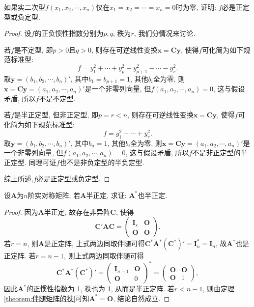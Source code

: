 \documentclass[../../main.tex]{subfiles}
\begin{document}
\begin{proposition}\label{proposition:实二次型只在原点处为零必是正定或负定型}
如果实二次型$f(x_1, x_2, \cdots, x_n)$仅在$x_1 = x_2 = \cdots = x_n = 0$时为零, 证明: $f$必是正定型或负定型.
\end{proposition}
\begin{proof}
设$f$的正负惯性指数分别为$p,q$, 秩为$r$, 我们分情况来讨论.

若$f$是不定型, 即$p > 0$且$q > 0$, 则存在可逆线性变换$\boldsymbol{x}=\boldsymbol{C}\boldsymbol{y}$, 使得$f$可化简为如下规范标准型:
\[
f = y_1^2 + \cdots + y_p^2 - y_{p + 1}^2 - \cdots - y_r^2.
\]
取$\boldsymbol{y}=(b_1, b_2, \cdots, b_n)'$, 其中$b_1 = b_{p + 1} = 1$, 其他$b_i$全为零, 则$\boldsymbol{x}=\boldsymbol{C}\boldsymbol{y}=(a_1, a_2, \cdots, a_n)'$是一个非零列向量, 但$f(a_1, a_2, \cdots, a_n) = 0$, 这与假设矛盾, 所以$f$不是不定型.

若$f$是半正定型, 但非正定型, 即$p = r < n$, 则存在可逆线性变换$\boldsymbol{x}=\boldsymbol{C}\boldsymbol{y}$, 使得$f$可化简为如下规范标准型:
\[
f = y_1^2 + \cdots + y_r^2.
\]
取$\boldsymbol{y}=(b_1, b_2, \cdots, b_n)'$, 其中$b_n = 1$, 其他$b_i$全为零, 则$\boldsymbol{x}=\boldsymbol{C}\boldsymbol{y}=(a_1, a_2, \cdots, a_n)'$是一个非零列向量, 但$f(a_1, a_2, \cdots, a_n) = 0$, 这与假设矛盾, 所以$f$不是非正定型的半正定型. 同理可证$f$也不是非负定型的半负定型.

综上所述,$f$必是正定型或负定型. 

\end{proof}

\begin{proposition}\label{proposition:半正定阵的伴随也半正定}
设$\boldsymbol{A}$为$n$阶实对称矩阵, 若$\boldsymbol{A}$半正定, 求证: $\boldsymbol{A}^*$也半正定.
\end{proposition}
\begin{proof}
因为$\boldsymbol{A}$半正定, 故存在非异阵$\boldsymbol{C}$, 使得
\[
\boldsymbol{C}'\boldsymbol{A}\boldsymbol{C}=\begin{pmatrix}
\boldsymbol{I}_r & \boldsymbol{O} \\
\boldsymbol{O} & \boldsymbol{O}
\end{pmatrix}.
\]
若$r = n$, 则$\boldsymbol{A}$是正定阵, 上式两边同取伴随可得$\boldsymbol{C}^*\boldsymbol{A}^*(\boldsymbol{C}^*)'=\boldsymbol{I}_n^* = \boldsymbol{I}_n$, 故$\boldsymbol{A}^*$也是正定阵. 若$r = n - 1$, 则上式两边同取伴随可得
\[
\boldsymbol{C}^*\boldsymbol{A}^*(\boldsymbol{C}^*)'=\begin{pmatrix}
\boldsymbol{I}_{n - 1} & \boldsymbol{O} \\
\boldsymbol{O} & 0
\end{pmatrix}^*=\begin{pmatrix}
\boldsymbol{O} & \boldsymbol{O} \\
\boldsymbol{O} & 1
\end{pmatrix},
\]
因此$\boldsymbol{A}^*$的正惯性指数为 1, 秩也为 1, 从而是半正定阵. 若$r < n - 1$, 则由\hyperref[theorem:伴随矩阵的秩]{定理\ref{theorem:伴随矩阵的秩}}可知$\boldsymbol{A}^*=\boldsymbol{O}$, 结论自然成立.

\end{proof}
\end{document}
